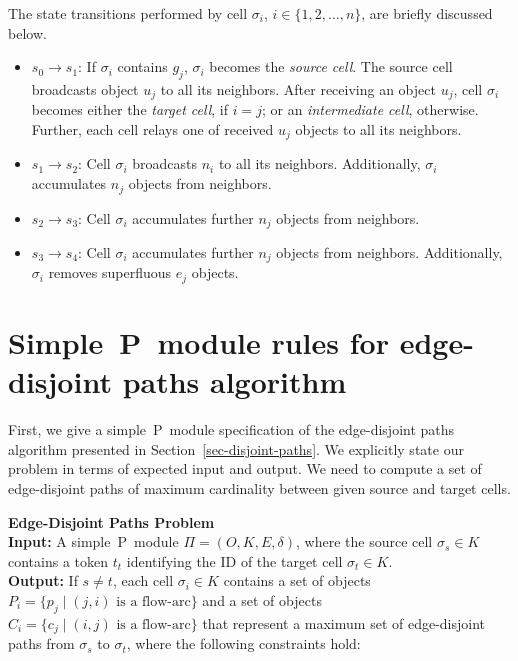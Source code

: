 \documentclass[preliminary,copyright,creativecommons]{eptcs}
\theoremstyle{remark}
\begin{document}
The state transitions performed by cell $\sigma_i$, $i \in \{1, 2, \ldots, n\}$, 
are briefly discussed below.

\begin{itemize}
\item $s_0 \rightarrow s_1$:
      If $\sigma_i$ contains $g_j$, $\sigma_i$ becomes the \emph{source cell}.
      The source cell broadcasts object $u_j$ to all its neighbors.
      After receiving an object $u_j$, 
      cell $\sigma_i$ becomes either the \emph{target cell}, if $i=j$;
      or an \emph{intermediate cell}, otherwise.
      Further, each cell relays one of received $u_j$ objects to all its neighbors.

\item $s_1 \rightarrow s_2$: 
      Cell $\sigma_i$ broadcasts $n_i$ to all its neighbors.
      Additionally, $\sigma_i$ accumulates $n_j$ objects from neighbors.

\item $s_2 \rightarrow s_3$: 
      Cell $\sigma_i$ accumulates further $n_j$ objects from neighbors.

\item $s_3 \rightarrow s_4$: 
      Cell $\sigma_i$ accumulates further $n_j$ objects from neighbors.
      Additionally, $\sigma_i$ removes superfluous $e_j$ objects.
\end{itemize}


\section{Simple~P~module rules for edge-disjoint paths algorithm}
\label{sec-edge-disjoint-path-algorithm-rules}

First, we give a simple~P~module specification of the 
edge-disjoint paths algorithm presented in Section~\ref{sec-disjoint-paths}.  
We explicitly state our problem in terms of expected input and output.
We need to compute a set of edge-disjoint paths of maximum cardinality
between given source and target cells. 

\smallskip

\noindent \textbf{Edge-Disjoint Paths Problem}\\
\noindent \textbf{Input:} A simple~P~module $\Pi= (O, K, E, \delta)$, 
where the source cell $\sigma_s \in K$ contains a token $t_t$ identifying
the ID of the target cell $\sigma_t \in K$.\\
\noindent \textbf{Output:}  If $s \neq t$, each cell $\sigma_i \in K$
contains a set of objects $P_i = \{ p_j \mid (j,i) \mbox{ is a flow-arc}\}$ and  
a set of objects $C_i = \{ c_j \mid (i,j) \mbox{ is a flow-arc}\}$ that 
represent a maximum set of edge-disjoint paths from $\sigma_s$ to $\sigma_t$, 
where the following constraints hold:\\
\end{document}
